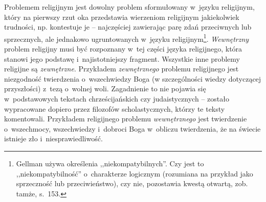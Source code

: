 Problemem religijnym jest dowolny problem sformułowany w~języku religijnym, który na pierwszy rzut oka przedstawia wierzeniom religijnym jakiekolwiek trudności, np. kontestuje je -- najczęściej zawierając parę zdań przeciwnych lub sprzecznych, ale jednakowo ugruntowanych w~języku religijnym\footnote{Gellman używa określenia ,,niekompatybilnych''. Czy jest to ,,niekompatybilność'' o~charakterze logicznym (rozumiana na przykład jako sprzeczność lub przeciwieństwo), czy nie, pozostawia kwestą otwartą, zob. tamże, s.~153.}. \textit{Wewnętrzny} problem religijny musi być rozpoznany w~tej części języka religijnego, która stanowi jego podstawę i~najistotniejszy fragment. Wszystkie inne problemy religijne są \textit{zewnętrzne}. Przykładem \textit{zewnętrznego} problemu religijnego jest niezgodność twierdzenia o~wszechwiedzy Boga (w szczególności wiedzy dotyczącej przyszłości) z~tezą o~wolnej woli. Zagadnienie to nie pojawia się w~podstawowych tekstach chrześcijańskich czy judaistycznych -- zostało wypracowane dopiero przez filozofów scholastycznych, którzy te teksty komentowali. Przykładem religijnego problemu \textit{wewnętrznego} jest twierdzenie o~wszechmocy, wszechwiedzy i~dobroci Boga w~obliczu twierdzenia, że na świecie istnieje zło i~niesprawiedliwość.

